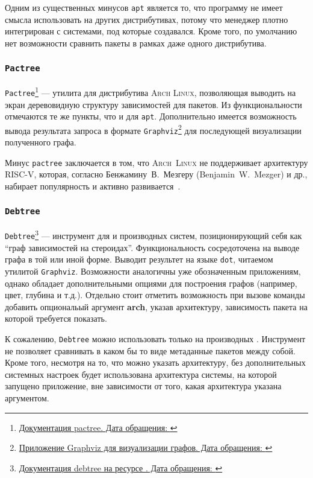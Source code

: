 Одним из существенных минусов \texttt{apt} является то, что программу не имеет смысла использовать на других дистрибутивах, потому что менеджер плотно интегрирован с системами, под которые создавался.
Кроме того, по умолчанию нет возможности сравнить пакеты в рамках даже одного дистрибутива.

\subsubsection{\texttt{Pactree}}
\texttt{Pactree}\footnote{\href{https://man.archlinux.org/man/extra/pacman-contrib/pactree.8.en}{Документация pactree. Дата обращения: }} --- утилита для дистрибутива \textsc{Arch Linux}, позволяющая выводить на экран деревовидную структуру зависимостей для пакетов.
Из функциональности отмечаются те же пункты, что и для \texttt{apt}. Дополнительно имеется возможность вывода результата запроса в формате \texttt{Graphviz}\footnote{\href{https://graphviz.org/}{Приложение Graphviz для визуализации графов. Дата обращения: }} для последующей визуализации полученного графа.

Минус \texttt{pactree} заключается в том, что \textsc{Arch~Linux} не поддерживает архитектуру \textsc{RISC-V}, которая, соглас\-но Бенжамину~В.~Мезгеру (Benjamin~W.~Mezger) и др., набирает популярность и активно развива\-ется~\cite{RISCVSurvey}.

\subsubsection{\texttt{Debtree}}
\texttt{Debtree}\footnote{\href{https://manpages.ubuntu.com/manpages/xenial/man1/debtree.1.html}{Документация debtree на ресурсе {\ubuntu}. Дата обращения: }} --- инструмент для {\debian} и производных систем, позиционирующий себя как ``граф зависимостей на стероидах''. Функциональность сосредоточена на выводе графа в той или иной форме.
Выводит результет на языке \texttt{dot}, читаемом утилитой \texttt{Graphviz}. Возможности аналогичны уже обозначенным приложениям, однако обладает дополнительными опциями для построения графов (например, цвет, глубина и т.д.).
Отдельно стоит отметить возможность при вызове команды добавить опциональый аргумент \textbf{arch}, указав архитектуру, зависимость пакета на которой требуется показать.

К сожалению, \texttt{Debtree} можно использовать только на производных {\debian}. Инструмент не позволяет сравнивать в каком бы то виде метаданные пакетов между собой.
Кроме того, несмотря на то, что можно указать архитектуру, без дополнительных системных настроек будет использована архитектура системы, на которой запущено приложение, вне зависимости от того, какая архитектура указана аргументом.

